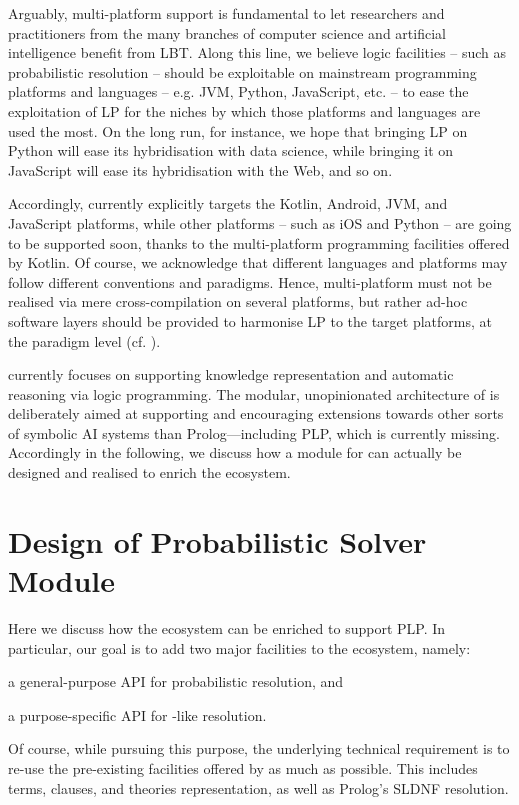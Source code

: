 \documentclass[12pt,a4paper,openright,twoside]{book}
\begin{document}
Arguably, multi-platform support is fundamental to let researchers and practitioners from the many branches of computer science and artificial intelligence benefit from LBT.
%
Along this line, we believe logic facilities -- such as probabilistic resolution -- should be exploitable on mainstream programming platforms and languages -- e.g. JVM, Python, JavaScript, etc. -- to ease the exploitation of LP for the niches by which those platforms and languages are used the most.
%
On the long run, for instance, we hope that bringing LP on Python will ease its hybridisation with data science, while bringing it on JavaScript will ease its hybridisation with the Web, and so on.

Accordingly, \twopkt{} currently explicitly targets the Kotlin, Android, JVM, and JavaScript platforms, while other platforms -- such as iOS and Python -- are going to be supported soon, thanks to the multi-platform programming facilities offered by Kotlin\footnotemark.
%
%
Of course, we acknowledge that different languages and platforms may follow different conventions and paradigms.
%
Hence, multi-platform must not be realised via mere cross-compilation on several platforms, but rather ad-hoc software layers should be provided to harmonise LP to the target platforms, at the paradigm level (cf. \cite{kotlindsi4prolog-woa2020}).

\twopkt{} currently focuses on supporting knowledge representation and automatic reasoning via logic programming.
%
The modular, unopinionated architecture of \twopkt{} is deliberately aimed at supporting and encouraging extensions towards other sorts of symbolic AI systems than Prolog---including PLP, which is currently missing.
%
Accordingly in the following, we discuss how a module for \problog{} can actually be designed and realised to enrich the \twopkt{} ecosystem.


\section{Design of Probabilistic Solver Module}
\label{sec:architecture}

Here we discuss how the \twopkt{} ecosystem can be enriched to support PLP.
%
In particular, our goal is to add two major facilities to the ecosystem, namely:
%
\begin{inlinelist}
    \item\label{goal:general-api-plp} a general-purpose API for probabilistic resolution, and
    \item\label{goal:specific-api-problog} a purpose-specific API for \problog{}-like resolution.
\end{inlinelist}
%
Of course, while pursuing this purpose, the underlying technical requirement is to re-use the pre-existing facilities offered by \twopkt{} as much as possible.
%
This includes terms, clauses, and theories representation, as well as Prolog's SLDNF resolution.
\end{document}
